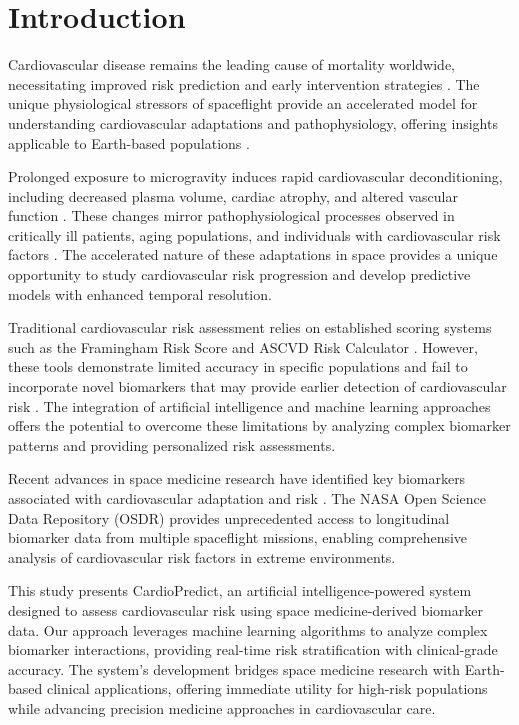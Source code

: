 \documentclass[11pt,a4paper]{article}
\begin{document}
\newpage

\section{Introduction}

Cardiovascular disease remains the leading cause of mortality worldwide, necessitating improved risk prediction and early intervention strategies \citep{who2023cardiovascular}. The unique physiological stressors of spaceflight provide an accelerated model for understanding cardiovascular adaptations and pathophysiology, offering insights applicable to Earth-based populations \citep{hughson2018cardiovascular}.

Prolonged exposure to microgravity induces rapid cardiovascular deconditioning, including decreased plasma volume, cardiac atrophy, and altered vascular function \citep{platts2014cardiovascular}. These changes mirror pathophysiological processes observed in critically ill patients, aging populations, and individuals with cardiovascular risk factors \citep{levine2002spaceflight}. The accelerated nature of these adaptations in space provides a unique opportunity to study cardiovascular risk progression and develop predictive models with enhanced temporal resolution.

Traditional cardiovascular risk assessment relies on established scoring systems such as the Framingham Risk Score and ASCVD Risk Calculator \citep{wilson1998prediction, goff2014acc}. However, these tools demonstrate limited accuracy in specific populations and fail to incorporate novel biomarkers that may provide earlier detection of cardiovascular risk \citep{cook2007use}. The integration of artificial intelligence and machine learning approaches offers the potential to overcome these limitations by analyzing complex biomarker patterns and providing personalized risk assessments.

Recent advances in space medicine research have identified key biomarkers associated with cardiovascular adaptation and risk \citep{crucian2018immune, zwart2021body}. The NASA Open Science Data Repository (OSDR) provides unprecedented access to longitudinal biomarker data from multiple spaceflight missions, enabling comprehensive analysis of cardiovascular risk factors in extreme environments.

This study presents CardioPredict, an artificial intelligence-powered system designed to assess cardiovascular risk using space medicine-derived biomarker data. Our approach leverages machine learning algorithms to analyze complex biomarker interactions, providing real-time risk stratification with clinical-grade accuracy. The system's development bridges space medicine research with Earth-based clinical applications, offering immediate utility for high-risk populations while advancing precision medicine approaches in cardiovascular care.
\end{document}
